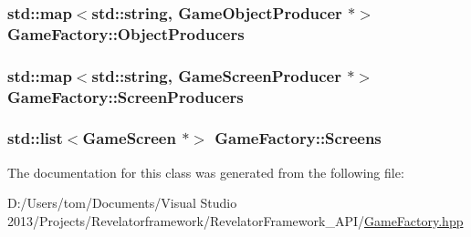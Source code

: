 \hypertarget{class_game_factory_ab72819fc3f241243d44827f75e0a2886}{
\subsubsection[{Object\-Producers}]{\setlength{\rightskip}{0pt plus 5cm}std\-::map$<$std\-::string, {\bf Game\-Object\-Producer} $\ast$$>$ Game\-Factory\-::\-Object\-Producers\hspace{0.3cm}{\ttfamily [private]}}}\label{class_game_factory_ab72819fc3f241243d44827f75e0a2886}
\hypertarget{class_game_factory_aa65ba67e6c3fc56ec228c801e02352c8}{
\subsubsection[{Screen\-Producers}]{\setlength{\rightskip}{0pt plus 5cm}std\-::map$<$std\-::string, {\bf Game\-Screen\-Producer} $\ast$$>$ Game\-Factory\-::\-Screen\-Producers\hspace{0.3cm}{\ttfamily [private]}}}\label{class_game_factory_aa65ba67e6c3fc56ec228c801e02352c8}
\hypertarget{class_game_factory_a16a8135f6d6b1b60c0d08b39340b34cc}{
\subsubsection[{Screens}]{\setlength{\rightskip}{0pt plus 5cm}std\-::list$<${\bf Game\-Screen} $\ast$$>$ Game\-Factory\-::\-Screens\hspace{0.3cm}{\ttfamily [private]}}}\label{class_game_factory_a16a8135f6d6b1b60c0d08b39340b34cc}


The documentation for this class was generated from the following file\-:\begin{DoxyCompactItemize}
\item 
D\-:/\-Users/tom/\-Documents/\-Visual Studio 2013/\-Projects/\-Revelatorframework/\-Revelator\-Framework\-\_\-\-A\-P\-I/\hyperlink{_game_factory_8hpp}{Game\-Factory.\-hpp}\end{DoxyCompactItemize}
